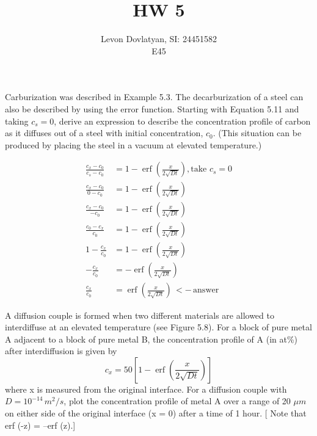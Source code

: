 \documentclass[12pt]{article}
\DeclareMathOperator\erf{erf}
\newenvironment{problem}[2][Problem]{\begin{trivlist}
\item[\hskip \labelsep {\bfseries #1}\hskip \labelsep {\bfseries #2.}]}{\end{trivlist}}
\begin{document}
\providecommand{\e}[1]{\ensuremath{\times 10^{#1}}}
\providecommand{\ex}[1]{\ensuremath{10^{#1}}}
 
\title{HW 5}%
\author{Levon Dovlatyan, SI: 24451582\\ %
E45} %
 
\maketitle
 
\begin{problem}{5.10} %
Carburization was described in Example 5.3.  The decarburization of a steel can also be described by using the error function.  Starting with Equation 5.11 and taking $c_s = 0$, derive an expression to describe the concentration profile of carbon as it diffuses out of a steel with initial concentration, $c_0$.  (This situation can be produced by placing the steel in a vacuum at elevated temperature.)
\end{problem}

\begin{align*}
\frac{c_x - c_0}{c_s-c_0} &= 1 - \erf(\frac{x}{2\sqrt{Dt}}), \text{take $c_s = 0$} \\
\frac{c_x - c_0}{0-c_0} &= 1 - \erf(\frac{x}{2\sqrt{Dt}}) \\ 
\frac{c_x - c_0}{-c_0} &= 1 - \erf(\frac{x}{2\sqrt{Dt}}) \\ 
\frac{c_0 - c_x}{c_0} &= 1 - \erf(\frac{x}{2\sqrt{Dt}}) \\ 
1 - \frac{c_x}{c_0} &= 1 - \erf(\frac{x}{2\sqrt{Dt}}) \\ 
- \frac{c_x}{c_0} &= - \erf(\frac{x}{2\sqrt{Dt}}) \\ 
\frac{c_x}{c_0} &= \erf(\frac{x}{2\sqrt{Dt}}) \, <- \,\text{answer}
\end{align*}

\begin{problem}{5.12}
A diffusion couple is formed when two different materials are allowed to interdiffuse at an elevated temperature (see Figure 5.8).  For a block of pure metal A adjacent to a block of pure metal B, the concentration profile of A (in at\%) after interdiffusion is given by 
\begin{equation}
c_x = 50[1 - \erf(\frac{x}{2\sqrt{Dt}})]
\end{equation}
where x is measured from the original interface.  For a diffusion couple with $D = \ex{-14}\, m^2/s$, plot the concentration profile of metal A over a range of 20 $\mu m$ on either side of the original interface (x = 0) after a time of 1 hour.  [ Note that erf (-z) = –erf (z).]
\end{problem}
\end{document}
